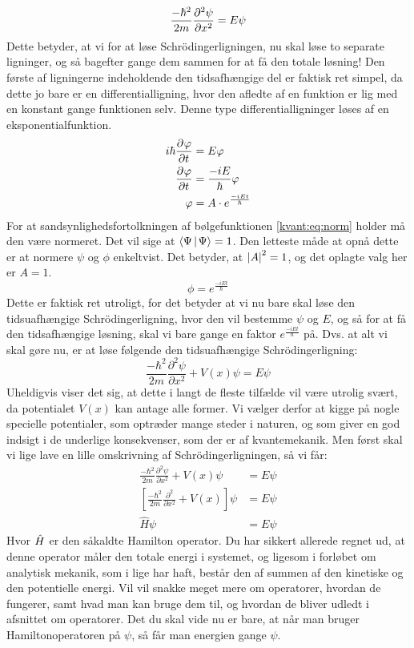 \documentclass[../Kvantemekanik.tex]{subfiles}
\begin{document}
\begin{equation}
\frac{-\hbar^2}{2m}\pdif[2]{x}\psi = E\psi
\end{equation}
Dette betyder, at vi for at løse Schrödingerligningen, nu skal løse to separate ligninger, og så bagefter gange dem sammen for at få den totale løsning!
Den første af ligningerne indeholdende den tidsafhængige del er faktisk ret simpel, da dette jo bare er en differentialligning, hvor den afledte af en funktion er lig med en konstant gange funktionen selv. Denne type differentialligninger løses af en eksponentialfunktion.
\begin{align}
    i\hbar\pdif{t}\phi&=E\phi\nonumber\\
    \pdif{t}\phi &=\frac{-iE}{\hbar}\phi\nonumber\\
    \phi&=A\cdot e^{\frac{-iEt}{\hbar}}
\end{align}
For at sandsynlighedsfortolkningen af bølgefunktionen \eqref{kvant:eq:norm} holder må den være normeret. Det vil sige at $\braket{\Psi}{\Psi}=1$. Den letteste måde at opnå dette er at normere $\psi$ og $\phi$ enkeltvist. Det betyder, at $\abs{A}^2=1$, og det oplagte valg her er $A=1$.
\begin{equation}
    \phi=e^{\frac{-iEt}{\hbar}}
\end{equation}
Dette er faktisk ret utroligt, for det betyder at vi nu bare skal løse den tidsuafhængige Schrödingerligning, hvor den vil bestemme $\psi$ og $E$, og så for at få den tidsafhængige løsning, skal vi bare gange en faktor $e^{\frac{-iEt}{\hbar}}$ på.
Dvs. at alt vi skal gøre nu, er at løse følgende den tidsuafhængige Schrödingerligning:
\begin{equation}
    \frac{-\hbar^{2}}{2m}\frac{\partial^2\psi}{\partial x^2}+V(x)\psi=E\psi
\end{equation}
Uheldigvis viser det sig, at dette i langt de fleste tilfælde vil være utrolig svært, da potentialet $V(x)$ kan antage alle former. Vi vælger derfor at kigge på nogle specielle potentialer, som optræder mange steder i naturen, og som giver en god indsigt i de underlige konsekvenser, som der er af kvantemekanik.
Men først skal vi lige lave en lille omskrivning af Schrödingerligningen, så vi får:
\begin{align}
    \frac{-\hbar^{2}}{2m}\frac{\partial^2\psi}{\partial x^2}+V(x)\psi&=E\psi\nonumber\\
    \left[\frac{-\hbar^{2}}{2m}\frac{\partial^2}{\partial x^2}+V(x)\right]\psi&=E\psi\nonumber\\
    \hat{H}\psi&=E\psi
\end{align}
Hvor $\op{H}$ er den såkaldte Hamilton operator. Du har sikkert allerede regnet ud, at denne operator måler den totale energi i systemet, og ligesom i forløbet om analytisk mekanik, som i lige har haft, består den af summen af den kinetiske og den potentielle energi. Vil vil snakke meget mere om operatorer, hvordan de fungerer, samt hvad man kan bruge dem til, og hvordan de bliver udledt i afsnittet om operatorer. Det du skal vide nu er bare, at når man bruger Hamiltonoperatoren på $\psi$, så får man energien gange $\psi$.
\end{document}
